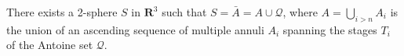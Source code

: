 There exists a 2-sphere $S$ in $\mathbf{R}^3$ such that $S = \bar{A} = A \cup \mathcal{Q}$, where $A = \bigcup_{i > n} A_i$ is the union of an ascending sequence of multiple annuli $A_i$ spanning the stages $T_i$ of the Antoine set $\mathcal{Q}$.
